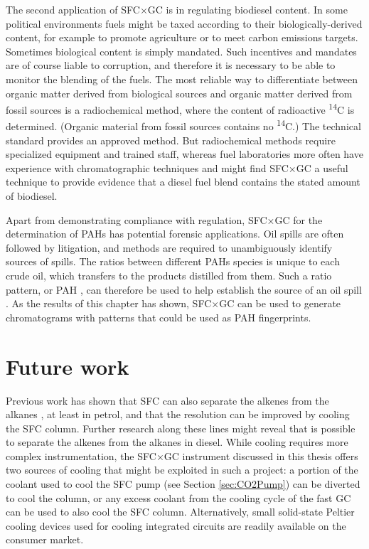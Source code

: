 The second application of SFC×GC is in regulating biodiesel content. In some
political environments fuels might be taxed according to their
biologically-derived content, for example to promote agriculture or to meet
carbon emissions targets. Sometimes biological content is simply mandated. Such
incentives and mandates are of course liable to corruption, and therefore it is
necessary to be able to monitor the blending of the fuels. The most
reliable way to differentiate between organic matter derived from biological
sources and organic matter derived from fossil sources is a radiochemical
method, where the content of radioactive \textsuperscript{14}C is determined.
(Organic material from fossil sources contains no \textsuperscript{14}C.) The
technical standard  provides an approved method. But radiochemical
methods require specialized equipment and trained staff, whereas fuel
laboratories more often have experience with chromatographic techniques and
might find SFC×GC a useful technique to provide evidence that a diesel fuel
blend contains the stated amount of biodiesel.

Apart from demonstrating compliance with regulation, SFC×GC for the
determination of PAHs has potential forensic applications. Oil spills are often
followed by litigation, and methods are required to unambiguously identify
sources of spills. The ratios between different PAHs species is unique to each
crude oil, which transfers to the products distilled from them. Such a ratio
pattern, or PAH , can therefore be used to help establish
the source of an oil spill \autocite{Wang2008}. As the results of this chapter
has shown, SFC×GC can be used to generate chromatograms with patterns that could
be used as PAH fingerprints.

\section{Future work}

Previous work has shown that SFC can also separate the alkenes from the alkanes
\autocite{Venter1999}, at least in petrol, and that the resolution can be
improved by cooling the SFC column. Further research along these lines might
reveal that is possible to separate the alkenes from the alkanes in diesel.
While cooling requires more complex instrumentation, the SFC×GC instrument
discussed in this thesis offers two sources of cooling that might be exploited
in such a project: a portion of the coolant used to cool the SFC pump (see
Section \ref{sec:CO2Pump}) can be diverted to cool the column, or any excess
coolant from the cooling cycle of the fast GC can be used to also cool the SFC
column. Alternatively, small solid-state Peltier cooling devices used for
cooling integrated circuits are readily available on the consumer market.

